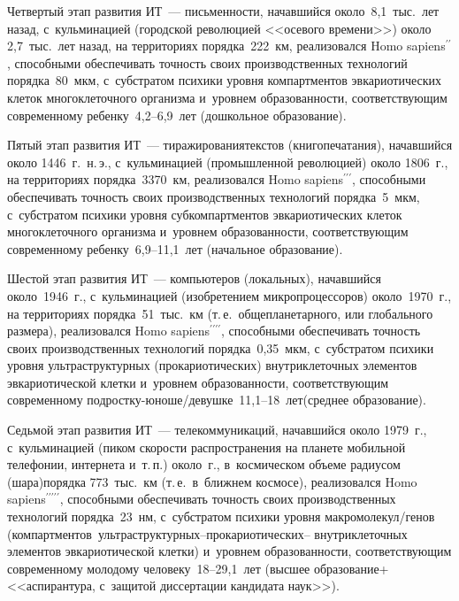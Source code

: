 \begin{multicols}{2}
  Четвертый этап развития ИТ~--- письменности, начавшийся 
около~8,1~тыс.\ лет назад, с~кульминацией (городской революцией 
<<осевого времени>>) около 2,7~тыс.\ лет назад, на территориях 
порядка~222~км, реализовался {Homo sapiens}$^{\prime\prime}$, 
способными обеспечивать точность своих производственных технологий 
порядка~80~мкм, с~суб\-стра\-том психики уровня компартментов 
эвкариотических клеток многоклеточного организма и~уровнем 
образованности, соответствующим современному ребенку~4,2--6,9~лет 
(дошкольное образование).
  
  Пятый этап развития ИТ~--- тиражирования\linebreak текс\-тов (книгопечатания), 
начавшийся около 1446~г.\ н.\,э., с~кульминацией (промышленной\linebreak 
революцией) около 1806~г., на территориях порядка~3370~км, реализовался 
{Homo sapiens}$^{\prime\prime\prime}$, способными обеспечивать 
точность своих производственных технологий порядка~5~мкм, с~субстратом 
психики уровня субкомпартментов эвкариотических клеток многоклеточного 
организма и~уровнем об\-ра\-зо\-ван\-ности, соответствующим современному 
ребенку~6,9--11,1~лет (начальное образование).
  
  Шестой этап развития ИТ~--- компьютеров (локальных), начавшийся 
около~1946~г., с~кульминацией (изобретением микропроцессоров) 
около~1970~г., на территориях порядка~51~тыс.\ км (т.\,е.\ 
общепланетарного, или глобального размера), реализовался {Homo 
sapiens}$^{\prime\prime\prime\prime}$, способными обеспечивать точ\-ность 
своих производственных технологий порядка~0,35~мкм, с~субстратом 
психики уровня\linebreak
 ультраструктурных (прокариотических) внутриклеточных 
элементов эвкариотической клетки и~уровнем об\-ра\-зо\-ван\-ности, 
соответствующим современному  
под\-рост\-ку-юно\-ше/де\-вуш\-ке~11,1--18~лет\linebreak (среднее образование).
  
  Седьмой этап развития ИТ~--- телекоммуникаций, начавшийся около 
1979~г., с~кульминацией (пиком ско\-рости распространения на планете 
мобильной телефонии, интернета и~т.\,п.) около~г., в~космическом 
объеме радиусом (шара)\linebreak порядка 773~тыс.\ км (т.\,е.\ в~ближнем космосе), 
реализовался {Homo sapiens}$^{\prime\prime\prime\prime\prime}$, 
способными обеспечивать точ\-ность своих производственных технологий 
порядка~23~нм, с~субстратом психики уровня мак\-ро\-мо\-ле\-кул/ге\-нов 
(компартментов\ ульт\-ра\-струк\-тур\-ных--про\-ка\-рио\-ти\-че\-ских--\linebreak
внут\-ри\-кле\-точ\-ных 
элементов эвкариотической клетки) и~уровнем 
об\-ра\-зо\-ван\-ности, со\-от\-вет\-ст\-ву\-ющим современному молодому  
че\-ло\-ве\-ку~18--29,1~лет (высшее обра\-зо\-ва\-ние\;+\;<<ас\-пи\-ран\-ту\-ра, 
с~защитой диссертации кандидата наук>>).
  

\end{multicols}
